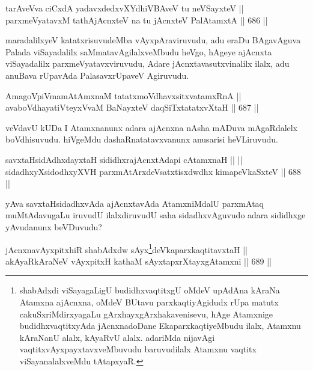 \begin{shl}
tarAveVva ciCxdA yadavxdedxvXYdhiVBAveV tu neVSayxteV || \\
parxmeVyatavxM tathA\s jAcnxteV na tu jAcnxteV PalAtamxtA \hfill || 686 ||  
\end{shl}

\begin{artha} 
maradalilxyeV katatxrisuvudeMba vAyxpAraviruvudu, adu eraDu BAgavAguva Palada viSayadalilx saMmatavAgilalxveMbudu heVgo, hAgeye ajAcnxta viSayadalilx parxmeVyatavxviruvudu, Adare jAcnxtavasutxvinalilx ilalx, adu anuBava rUpavAda PalasavxrUpaveV Agiruvudu.
\end{artha}

\begin{shl}
AmagoV\s piVmamAtAmxnaM tatatxmoVdhavxsitxvatamxRnA || \\
avaboVdhayatiVteyxVvaM BaNayxteV daqSiTxtatatxvXtaH \hfill || 687 ||  
\end{shl}

\begin{artha} 
veVdavU kUDa I Atamxnanunx adara ajAcnxna nAsha mADuva mAgaRdalelx boVdhisuvudu. hiVgeMdu dashaRnatatavxvanunx anusarisi heVLiruvudu.
\end{artha}

\begin{shl}
savxtaHsidAdhxdayxtaH sididhxrajAcnxtAdapi cA\s \s tamxnaH ||  || \\
sidadhxyXsidodhxyXVH parxmAtArxdeVsatxtisxdwdhx kimapeVkaSxteV \hfill || 688 ||  
\end{shl}

\begin{artha} 
yAva savxtaHsidadhxvAda ajAcnxtavAda AtamxniMdalU parxmAtaq muMtAdavugaLu iruvudU ilalxdiruvudU saha sidadhxvAguvudo adara sididhxge yAvudanunx beVDuvudu?
\end{artha}


\begin{shl}
jAcnxnavAyxpitxhiR shabAdxdw sAyx\footnote{shabAdxdi viSayagaLigU budidhxvaqtitxgU oMdeV upAdAna kAraNa Atamxna ajAcnxna, oMdeV BUtavu parxkaqtiyAgidudx rUpa matutx cakuSxriMdirxyagaLu gArxhayxgArxhakavenisevu, hAge Atamxnige budidhxvaqtitxyAda jAcnxnadoDane EkaparxkaqtiyeMbudu ilalx, Atamxnu kAraNanU alalx, kAyaRvU alalx. adariMda nijavAgi vaqtitxvAyxpayxtavxveMbuvudu baruvudilalx Atamxnu vaqtitx viSayanalalxveMdu tAtapxyaR.}deVkaparxkaqtitavxtaH || \\
akAyaRkAraNeV vAyxpitxH kathaM sAyxtapxrXtayxgAtamxni \hfill || 689 ||  
\end{shl}

